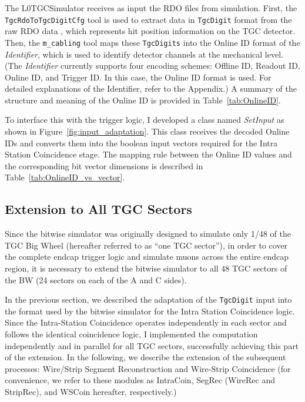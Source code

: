 The L0TGCSimulator receives as input the RDO files from simulation. First, the \\\texttt{TgcRdoToTgcDigitCfg} tool is used to extract data in \texttt{TgcDigit} format from the raw RDO data , which represents hit position information on the TGC detector. Then, the \texttt{m\_cabling} tool maps these \texttt{TgcDigits} into the Online ID format of the \textit{Identifier}, which is used to identify detector channels at the mechanical level. (The \textit{Identifier} currently supports four encoding schemes: Offline ID, Readout ID, Online ID, and Trigger ID. In this case, the Online ID format is used. For detailed explanations of the Identifier, refer to the Appendix.) A summary of the structure and meaning of the Online ID is provided in Table~\ref{tab:OnlineID}.


To interface this with the trigger logic, I developed a class named \textit{SetInput} as shown in Figure~\ref{fig:input_adaptation}. This class receives the decoded Online IDs and converts them into the boolean input vectors required for the Intra Station Coincidence stage. The mapping rule between the Online ID values and the corresponding bit vector dimensions is described in Table~\ref{tab:OnlineID_vs_vector}.


\subsection{Extension to All TGC Sectors} \label{subsec:Extension}
Since the bitwise simulator was originally designed to simulate only 1/48 of the TGC Big Wheel (hereafter referred to as “one TGC sector”), in order to cover the complete endcap trigger logic and simulate muons across the entire endcap region, it is necessary to extend the bitwise simulator to all 48 TGC sectors of the BW (24 sectors on each of the A and C sides).

In the previous section, we described the adaptation of the \texttt{TgcDigit} input into the format used by the bitwise simulator for the Intra Station Coincidence logic. Since the Intra-Station Coincidence operates independently in each sector and follows the identical coincidence logic, I implemented the computation independently and in parallel for all TGC sectors, successfully achieving this part of the extension. In the following, we describe the extension of the subsequent processes: Wire/Strip Segment Reconstruction and Wire-Strip Coincidence (for convenience, we refer to these modules as IntraCoin, SegRec (WireRec and StripRec), and WSCoin hereafter, respectively.)

